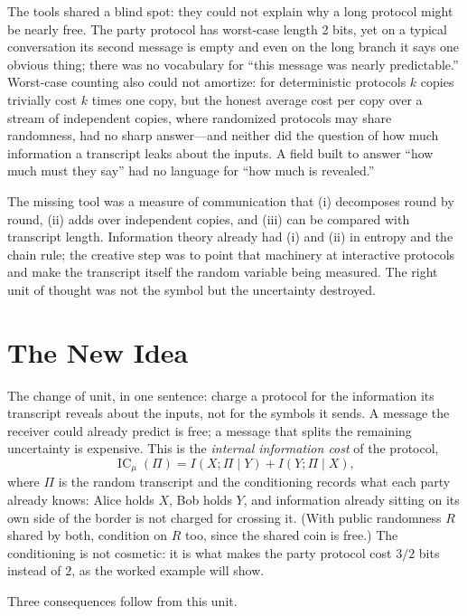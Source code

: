 The tools shared a blind spot: they could not explain why a long protocol might be nearly free. The party protocol has worst-case length 2 bits, yet on a typical conversation its second message is empty and even on the long branch it says one obvious thing; there was no vocabulary for ``this message was nearly predictable.'' Worst-case counting also could not amortize: for deterministic protocols $k$ copies trivially cost $k$ times one copy, but the honest average cost per copy over a stream of independent copies, where randomized protocols may share randomness, had no sharp answer---and neither did the question of how much information a transcript leaks about the inputs. A field built to answer ``how much must they say'' had no language for ``how much is revealed.''

The missing tool was a measure of communication that (i) decomposes round by round, (ii) adds over independent copies, and (iii) can be compared with transcript length. Information theory already had (i) and (ii) in entropy and the chain rule; the creative step was to point that machinery at interactive protocols and make the transcript itself the random variable being measured. The right unit of thought was not the symbol but the uncertainty destroyed.

\section{The New Idea}
The change of unit, in one sentence: charge a protocol for the information its transcript reveals about the inputs, not for the symbols it sends. A message the receiver could already predict is free; a message that splits the remaining uncertainty is expensive. This is the \emph{internal information cost} of the protocol,
\[
\operatorname{IC}_\mu(\Pi)=I(X;\Pi\mid Y)+I(Y;\Pi\mid X),
\]
where $\Pi$ is the random transcript and the conditioning records what each party already knows: Alice holds $X$, Bob holds $Y$, and information already sitting on its own side of the border is not charged for crossing it. (With public randomness $R$ shared by both, condition on $R$ too, since the shared coin is free.) The conditioning is not cosmetic: it is what makes the party protocol cost $3/2$ bits instead of $2$, as the worked example will show.

Three consequences follow from this unit.

